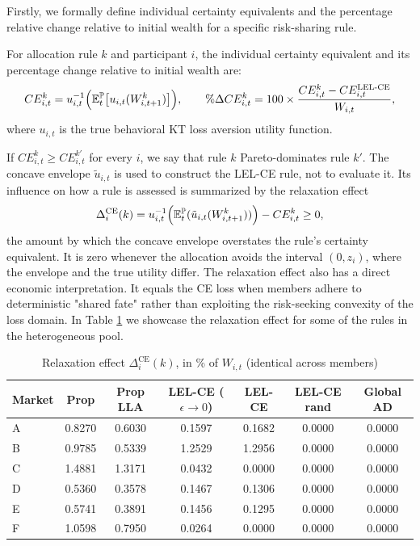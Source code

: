 Firstly, we formally define individual certainty equivalents and the percentage relative change relative to initial wealth for a specific risk-sharing rule.
\begin{definition}
    For allocation rule $k$ and participant $i$, the individual certainty equivalent and its percentage change relative to initial wealth are:
    \begin{equation}
        CE_{i,t}^k = u_{i,t}^{-1}\Big( \mathbb{E}_t^{\mathbb{P}}\big[u_{i,t}(W_{i,t+1}^k)\big] \Big), \qquad \%\Delta CE_{i,t}^k = 100 \times \frac{CE_{i,t}^k - CE_{i,t}^{\text{LEL-CE}}}{W_{i,t}},
    \end{equation}
    where $u_{i,t}$ is the true behavioral KT loss aversion utility function.
\end{definition}
If $CE_{i,t}^k \geq CE_{i,t}^{k'}$ for every $i$, we say that rule $k$ Pareto-dominates rule $k'$. The concave envelope $\tilde{u}_{i,t}$ is used to construct the LEL-CE rule, not to evaluate it. Its influence on how a rule is assessed is summarized by the relaxation effect
\begin{equation*}
    \Delta_i^{\text{CE}}(k) = u_{i,t}^{-1}\Big(\mathbb{E}_t^{\mathbb{P}}(\tilde{u}_{i,t}(W_{i,t+1}^k))\Big) - CE_{i,t}^k \geq 0,
\end{equation*}
the amount by which the concave envelope overstates the rule's certainty equivalent. It is zero whenever the allocation avoids the interval $(0, z_i)$, where the envelope and the true utility differ. The relaxation effect also has a direct economic interpretation. It equals the CE loss when members adhere to deterministic "shared fate" rather than exploiting the risk-seeking convexity of the loss domain. In Table \ref{tab:relaxation_effect} we showcase the relaxation effect for some of the rules in the heterogeneous pool.
\begin{table}[htbp]
  \centering
  \small
  \caption{Relaxation effect $\Delta_i^{\text{CE}}(k)$, in \% of $W_{i,t}$ (identical across members)}
  \label{tab:relaxation_effect}
  \vspace{0.5em}
  \begin{tabular*}{\textwidth}{@{\extracolsep{\fill}} l cccccc @{}}
    \toprule
    \textbf{Market} & \textbf{Prop} & \textbf{Prop LLA} & \textbf{LEL-CE ($\epsilon \to 0$)} & \textbf{LEL-CE} & \textbf{LEL-CE rand} & \textbf{Global AD} \\
    \midrule
    A & 0.8270 & 0.6030 & 0.1597 & 0.1682 & 0.0000 & 0.0000 \\
    B & 0.9785 & 0.5339 & 1.2529 & 1.2956 & 0.0000 & 0.0000 \\
    C & 1.4881 & 1.3171 & 0.0432 & 0.0000 & 0.0000 & 0.0000 \\
    D & 0.5360 & 0.3578 & 0.1467 & 0.1306 & 0.0000 & 0.0000 \\
    E & 0.5741 & 0.3891 & 0.1456 & 0.1295 & 0.0000 & 0.0000 \\
    F & 1.0598 & 0.7950 & 0.0264 & 0.0000 & 0.0000 & 0.0000 \\
    \bottomrule
  \end{tabular*}
\end{table}
